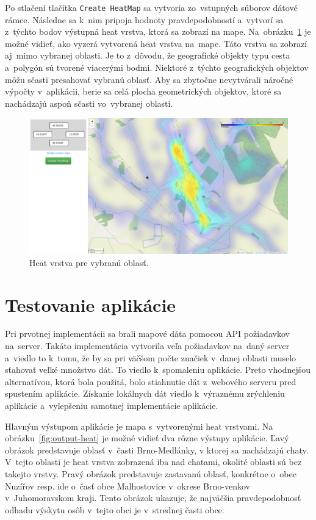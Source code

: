 Po stlačení tlačítka \texttt{Create HeatMap} sa vytvoria zo~vstupných súborov dátové rámce. Následne sa k~nim pripoja hodnoty pravdepodobností a~vytvorí sa z~týchto bodov výstupná heat vrstva, ktorá sa zobrazí na mape. Na~obrázku~\ref{fig:bosovice-heatmap} je možné vidieť, ako vyzerá vytvorená heat vrstva na~mape. Táto vrstva sa zobrazí aj~mimo vybranej oblasti. Je to z~dôvodu, že geografické objekty typu cesta a~polygón sú tvorené viacerými bodmi. Niektoré z~týchto geografických objektov môžu sčasti presahovať vybranú oblasť. Aby sa zbytočne nevytvárali náročné výpočty v~aplikácii, berie sa celá plocha geometrických objektov, ktoré sa nachádzajú aspoň sčasti vo~vybranej oblasti.

\begin{figure}[ht]
    \centering
    \includegraphics[width=1.0\linewidth]{obrazky-figures/bosovice-heatmap.png}
    \caption{Heat vrstva pre vybranú oblasť.}
    \label{fig:bosovice-heatmap}
\end{figure}


\section{Testovanie aplikácie}
Pri prvotnej implementácii sa brali mapové dáta pomocou API požiadavkov na~server. Takáto implementácia vytvorila veľa požiadavkov na~daný server a~viedlo to k~tomu, že by sa pri väčšom počte značiek v~danej oblasti muselo sťahovať veľké množstvo dát. To viedlo k~spomaleniu aplikácie. Preto vhodnejšou alternatívou, ktorá bola použitá, bolo stiahnutie dát z~webového serveru pred spustením aplikácie. Získanie lokálnych dát viedlo k~výraznému zrýchleniu aplikácie a~vylepšeniu samotnej implementácie aplikácie.

Hlavným výstupom aplikácie je mapa s~vytvorenými heat vrstvami. Na obrázku~\ref{fig:output-heat} je možné vidieť dva rôzne výstupy aplikácie. Ľavý obrázok predstavuje oblasť v~časti Brno-Medlánky, v ktorej sa nachádzajú chaty. V~tejto oblasti je heat vrstva zobrazená iba nad chatami, okolité oblasti sú bez takejto vrstvy. Pravý obrázok predstavuje zastavanú oblasť, konkrétne o~obec Nuzířov resp. ide o~časť obce Malhostovice v~okrese Brno-venkov v~Juhomoravskom kraji. Tento obrázok ukazuje, že najväčšia pravdepodobnosť odhadu výskytu osôb v~tejto obci je v~strednej časti obce.

